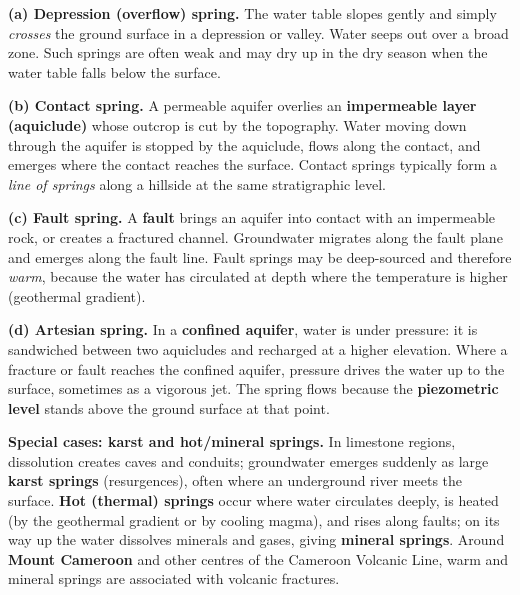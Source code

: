\documentclass[11pt]{article}
\begin{document}
\textbf{(a) Depression (overflow) spring.} The water table slopes gently and simply \emph{crosses} the ground surface in a depression or valley. Water seeps out over a broad zone. Such springs are often weak and may dry up in the dry season when the water table falls below the surface.

\textbf{(b) Contact spring.} A permeable aquifer overlies an \textbf{impermeable layer (aquiclude)} whose outcrop is cut by the topography. Water moving down through the aquifer is stopped by the aquiclude, flows along the contact, and emerges where the contact reaches the surface. Contact springs typically form a \emph{line of springs} along a hillside at the same stratigraphic level.

\textbf{(c) Fault spring.} A \textbf{fault} brings an aquifer into contact with an impermeable rock, or creates a fractured channel. Groundwater migrates along the fault plane and emerges along the fault line. Fault springs may be deep-sourced and therefore \emph{warm}, because the water has circulated at depth where the temperature is higher (geothermal gradient).

\textbf{(d) Artesian spring.} In a \textbf{confined aquifer}, water is under pressure: it is sandwiched between two aquicludes and recharged at a higher elevation. Where a fracture or fault reaches the confined aquifer, pressure drives the water up to the surface, sometimes as a vigorous jet. The spring flows because the \textbf{piezometric level} stands above the ground surface at that point.

\textbf{Special cases: karst and hot/mineral springs.} In limestone regions, dissolution creates caves and conduits; groundwater emerges suddenly as large \textbf{karst springs} (resurgences), often where an underground river meets the surface. \textbf{Hot (thermal) springs} occur where water circulates deeply, is heated (by the geothermal gradient or by cooling magma), and rises along faults; on its way up the water dissolves minerals and gases, giving \textbf{mineral springs}. Around \textbf{Mount Cameroon} and other centres of the Cameroon Volcanic Line, warm and mineral springs are associated with volcanic fractures.
\end{document}
